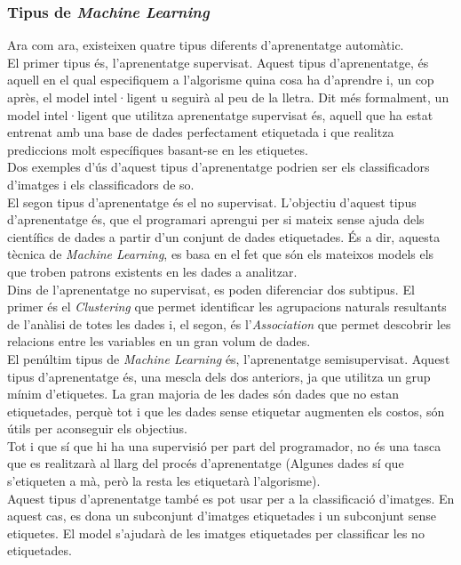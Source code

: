 \documentclass[a4paper,12pt]{article}
\begin{document}
\subsubsection*{Tipus de \textit{Machine Learning}}
Ara com ara, existeixen quatre tipus diferents d'aprenentatge automàtic.\\
El primer tipus és, l'aprenentatge supervisat. Aquest tipus d'aprenentatge, és aquell en el qual especifiquem a l'algorisme quina cosa ha d'aprendre i, un cop après, el model intel·ligent u seguirà al peu de la lletra. Dit més formalment, un model intel·ligent que utilitza aprenentatge supervisat és, aquell que ha estat entrenat amb una base de dades perfectament etiquetada i que realitza prediccions molt específiques basant-se en les etiquetes.\\
Dos exemples d'ús d'aquest tipus d'aprenentatge podrien ser els classificadors d'imatges i els classificadors de so.\\
El segon tipus d'aprenentatge és el no supervisat. L'objectiu d'aquest tipus d'aprenentatge és, que el programari aprengui per si mateix sense ajuda dels científics de dades a partir d'un conjunt de dades etiquetades. És a dir, aquesta tècnica de \textit{Machine Learning}, es basa en el fet que són els mateixos models els que troben patrons existents en les dades a analitzar.\\
Dins de l'aprenentatge no supervisat, es poden diferenciar dos subtipus. El primer és el \textit{Clustering} que permet identificar les agrupacions naturals resultants de l'anàlisi de totes les dades i, el segon, és l'\textit{Association} que permet descobrir les relacions entre les variables en un gran volum de dades.\\
El penúltim tipus de \textit{Machine Learning} és, l'aprenentatge semisupervisat. Aquest tipus d'aprenentatge és, una mescla dels dos anteriors, ja que utilitza un grup mínim d'etiquetes. La gran majoria de les dades són dades que no estan etiquetades, perquè tot i que les dades sense etiquetar augmenten els costos, són útils per aconseguir els objectius.\\
Tot i que sí que hi ha una supervisió per part del programador, no és una tasca que es realitzarà al llarg del procés d'aprenentatge (Algunes dades sí que s'etiqueten a mà, però la resta les etiquetarà l'algorisme).\\
Aquest tipus d'aprenentatge també es pot usar per a la classificació d'imatges. En aquest cas, es dona un subconjunt d'imatges etiquetades i un subconjunt sense etiquetes. El model s'ajudarà de les imatges etiquetades per classificar les no etiquetades.\\
\end{document}
